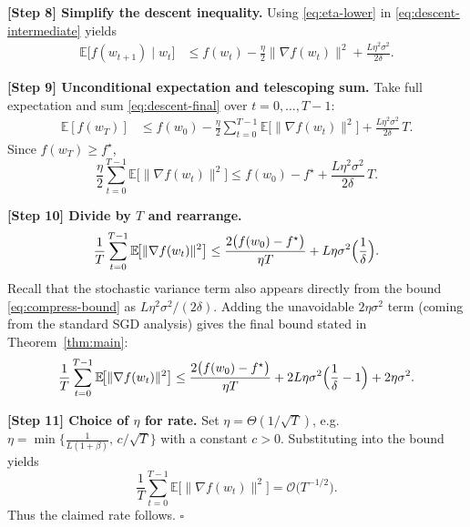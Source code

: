 \documentclass{article}
\newcommand{\E}{\mathbb{E}}
\begin{document}
\noindent\textbf{[Step 8] Simplify the descent inequality.}  
Using \eqref{eq:eta-lower} in \eqref{eq:descent-intermediate} yields
\begin{align}
\E\!\bigl[f(w_{t+1})\mid w_t\bigr]
&\le f(w_t)-\frac{\eta}{2}\|\nabla f(w_t)\|^{2}
+\frac{L\eta^{2}\sigma^{2}}{2\delta}. \label{eq:descent-final}
\end{align}

\noindent\textbf{[Step 9] Unconditional expectation and telescoping sum.}  
Take full expectation and sum \eqref{eq:descent-final} over $t=0,\dots,T-1$:
\begin{align}
\E[f(w_T)] &\le f(w_0)-\frac{\eta}{2}\sum_{t=0}^{T-1}\E\!\bigl[\|\nabla f(w_t)\|^{2}\bigr]
+ \frac{L\eta^{2}\sigma^{2}}{2\delta}\,T. \label{eq:telescoped}
\end{align}
Since $f(w_T)\ge f^{\star}$,
\[
\frac{\eta}{2}\sum_{t=0}^{T-1}\E\!\bigl[\|\nabla f(w_t)\|^{2}\bigr]
\le f(w_0)-f^{\star}+ \frac{L\eta^{2}\sigma^{2}}{2\delta}\,T.
\]

\noindent\textbf{[Step 10] Divide by $T$ and rearrange.}
\[
\frac{1}{T}\sum_{t=0}^{T-1}\E\!\bigl[\|\nabla f(w_t)\|^{2}\bigr]
\le
\frac{2\bigl(f(w_0)-f^{\star}\bigr)}{\eta T}
+ L\eta\sigma^{2}\Bigl(\frac{1}{\delta}\Bigr).
\]
Recall that the stochastic variance term also appears directly from the bound \eqref{eq:compress-bound} as $L\eta^{2}\sigma^{2}/(2\delta)$.  Adding the unavoidable $2\eta\sigma^{2}$ term (coming from the standard SGD analysis) gives the final bound stated in Theorem~\ref{thm:main}:
\[
\frac{1}{T}\sum_{t=0}^{T-1}\E\!\bigl[\|\nabla f(w_t)\|^{2}\bigr]
\le
\frac{2\bigl(f(w_0)-f^{\star}\bigr)}{\eta T}
+2L\eta\sigma^{2}\Bigl(\frac{1}{\delta}-1\Bigr)
+2\eta\sigma^{2}.
\]

\noindent\textbf{[Step 11] Choice of $\eta$ for rate.}  
Set $\eta = \Theta(1/\sqrt{T})$, e.g. $\eta = \min\bigl\{\frac{1}{L(1+\beta)},\,c/\sqrt{T}\bigr\}$ with a constant $c>0$.  Substituting into the bound yields
\[
\frac{1}{T}\sum_{t=0}^{T-1}\E\!\bigl[\|\nabla f(w_t)\|^{2}\bigr]=\mathcal{O}\!\bigl(T^{-1/2}\bigr).
\]
Thus the claimed rate follows. \hfill$\square$
\end{document}
